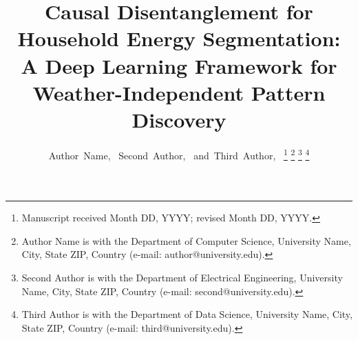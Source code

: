 \documentclass[journal]{IEEEtran}
\begin{document}
\title{Causal Disentanglement for Household Energy Segmentation: A Deep Learning Framework for Weather-Independent Pattern Discovery}

\author{Author~Name,~
        Second~Author,~
        and~Third~Author,~
\thanks{Manuscript received Month DD, YYYY; revised Month DD, YYYY.}
\thanks{Author Name is with the Department of Computer Science, University Name, City, State ZIP, Country (e-mail: author@university.edu).}%
\thanks{Second Author is with the Department of Electrical Engineering, University Name, City, State ZIP, Country (e-mail: second@university.edu).}%
\thanks{Third Author is with the Department of Data Science, University Name, City, State ZIP, Country (e-mail: third@university.edu).}}

\maketitle
\end{document}
